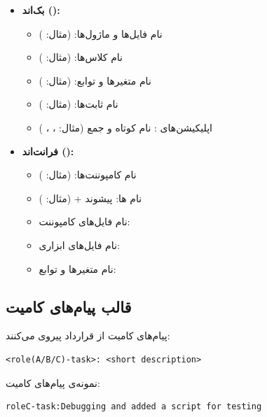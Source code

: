\documentclass[12pt]{article} %
\theoremstyle{definition}
\begin{document}
\begin{itemize}[rightmargin=1cm]
  \item \textbf{بک‌اند ():}
    \begin{itemize}
      \item نام فایل‌ها و ماژول‌ها:  (مثال: )
      \item نام کلاس‌ها:  (مثال: )
      \item نام متغیرها و توابع:  (مثال: )
      \item نام ثابت‌ها:  (مثال: )
      \item اپلیکیشن‌های : نام کوتاه و جمع (مثال: ، ، )
    \end{itemize}
  \item \textbf{فرانت‌اند ():}
    \begin{itemize}
      \item نام کامپوننت‌ها:  (مثال: )
      \item نام ها: پیشوند  +  (مثال: )
      \item نام فایل‌های کامپوننت: 
      \item نام فایل‌های ابزاری: 
      \item نام متغیرها و توابع: 
    \end{itemize}
\end{itemize}

\subsection{قالب پیام‌های کامیت}

پیام‌های کامیت از قرارداد  پیروی می‌کنند:

\begin{latin}
\begin{lstlisting}
<role(A/B/C)-task>: <short description>
\end{lstlisting}
\end{latin}


نمونه‌ی پیام‌های کامیت:

\begin{latin}
\begin{lstlisting}
roleC-task:Debugging and added a script for testing
\end{lstlisting}
\end{latin}
\end{document}
